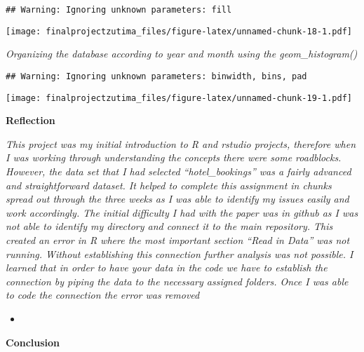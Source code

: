 \documentclass[
]{article}
\providecommand{\tightlist}{%
  \setlength{\itemsep}{0pt}\setlength{\parskip}{0pt}}
\begin{document}
\begin{verbatim}
## Warning: Ignoring unknown parameters: fill
\end{verbatim}

\texttt{[image: finalprojectzutima\_files/figure-latex/unnamed-chunk-18-1.pdf]}

\emph{Organizing the database according to year and month using the
geom\_histogram()}

\begin{verbatim}
## Warning: Ignoring unknown parameters: binwidth, bins, pad
\end{verbatim}

\texttt{[image: finalprojectzutima\_files/figure-latex/unnamed-chunk-19-1.pdf]}

\textbf{Reflection}

\emph{This project was my initial introduction to R and rstudio
projects, therefore when I was working through understanding the
concepts there were some roadblocks. However, the data set that I had
selected ``hotel\_bookings'' was a fairly advanced and straightforward
dataset. It helped to complete this assignment in chunks spread out
through the three weeks as I was able to identify my issues easily and
work accordingly. The initial difficulty I had with the paper was in
github as I was not able to identify my directory and connect it to the
main repository. This created an error in R where the most important
section ``Read in Data'' was not running. Without establishing this
connection further analysis was not possible. I learned that in order to
have your data in the code we have to establish the connection by piping
the data to the necessary assigned folders. Once I was able to code the
connection the error was removed}

\begin{itemize}
\tightlist
\item
\end{itemize}

\textbf{Conclusion}
\end{document}
